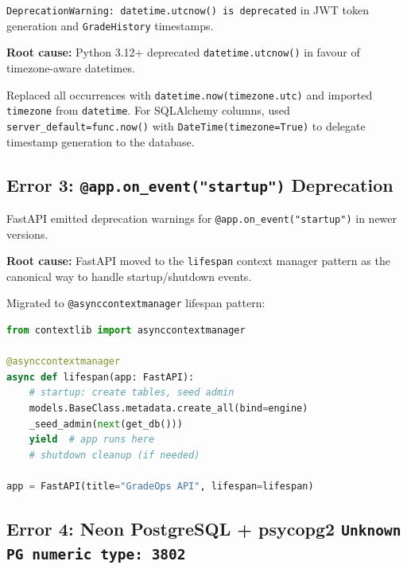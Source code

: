 \documentclass[12pt,a4paper]{article}
\begin{document}
\begin{errorbox}[Error]
\texttt{DeprecationWarning: datetime.utcnow() is deprecated} in JWT token generation and \texttt{GradeHistory} timestamps.
\end{errorbox}

\textbf{Root cause:} Python 3.12+ deprecated \texttt{datetime.utcnow()} in favour of timezone-aware datetimes.

\begin{successbox}[Fix]
Replaced all occurrences with \texttt{datetime.now(timezone.utc)} and imported \texttt{timezone} from \texttt{datetime}. For SQLAlchemy columns, used \texttt{server\_default=func.now()} with \texttt{DateTime(timezone=True)} to delegate timestamp generation to the database.
\end{successbox}

\subsection{Error 3: \texttt{@app.on\_event("startup")} Deprecation}

\begin{errorbox}[Error]
FastAPI emitted deprecation warnings for \texttt{@app.on\_event("startup")} in newer versions.
\end{errorbox}

\textbf{Root cause:} FastAPI moved to the \texttt{lifespan} context manager pattern as the canonical way to handle startup/shutdown events.

\begin{successbox}[Fix]
Migrated to \texttt{@asynccontextmanager} lifespan pattern:
\begin{lstlisting}[language=Python]
from contextlib import asynccontextmanager

@asynccontextmanager
async def lifespan(app: FastAPI):
    # startup: create tables, seed admin
    models.BaseClass.metadata.create_all(bind=engine)
    _seed_admin(next(get_db()))
    yield  # app runs here
    # shutdown cleanup (if needed)

app = FastAPI(title="GradeOps API", lifespan=lifespan)
\end{lstlisting}
\end{successbox}

\subsection{Error 4: Neon PostgreSQL + psycopg2 \texttt{Unknown PG numeric type: 3802}}
\end{document}
